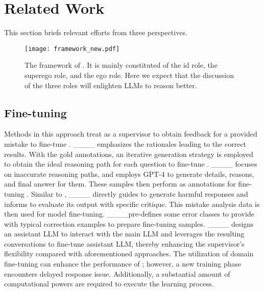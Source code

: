 \section{Related Work}
\label{sec:rel}


This section briefs relevant efforts from three perspectives.

\begin{figure*}
	\centering
        \vspace{-1ex}
	\texttt{[image: framework\_new.pdf]}
	\vspace{-4ex}
	\caption{The framework of \ours. It is mainly constituted of the id role, the superego role, and the ego role. Here we expect that the discussion of the three roles will  enlighten LLMs to reason better.}
 \label{fig:framework}
 \vspace{-3ex}
\end{figure*}


\subsection{Fine-tuning \llm}
Methods in this approach treat \llm as a supervisor to obtain feedback for a provided mistake to fine-tune \llm.
\sta____ emphasizes the rationales leading to the correct results. With the gold annotations, an iterative generation strategy is employed to obtain the ideal reasoning path for each question to fine-tune \llm.
\lema____ focuses on inaccurate reasoning paths, and employs GPT-4 to generate details, reasons, and final answer for them. These samples then perform as annotations for fine-tuning \llm.
Similar to \lema, \gwfs____ directly guides \llm to generate harmful responses and informs \llm to evaluate its output with specific critique. This mistake analysis data is then used for model fine-tuning. 
\srethink____pre-defines some error classes to provide \llm with typical correction examples to prepare fine-tuning samples.
\salam____ designs an assistant LLM to interact with the main LLM and leverages the resulting conversations to fine-tune assistant LLM, thereby enhancing the supervisor's flexibility compared with aforementioned approaches.
The utilization of domain fine-tuning can enhance the performance of \llm; however, a new training phase encounters delayed response issue. 
Additionally, a substantial amount of computational powers are required to execute the learning process. 

